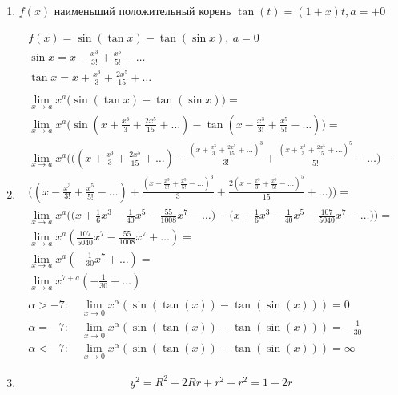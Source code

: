 \begin{enumerate}
		\item $f(x)$ наименьший положительный корень $\tan(t)=(1+x) t, a=+0$
		\item
			\begin{gather*}
				f(x) = \sin(\tan x) - \tan(\sin x),\ a = 0\\
				\sin x = x - \frac{x^{3}}{3!} + \frac{x^{5}}{5!} - \ldots\\
				\tan x = x + \frac{x^{3}}{3} + \frac{2x^{5}}{15} + \ldots\\
				\\
				\lim\limits_{x \to a} x^a \Big( \sin(\tan x) - \tan(\sin x) \Big) = \\
				\lim\limits_{x \to a} x^a \Big( \sin(x + \frac{x^{3}}{3} + \frac{2x^{5}}{15} + \ldots) - \tan(x - \frac{x^{3}}{3!} + \frac{x^{5}}{5!} - \ldots) \Big) = \\
				\lim\limits_{x \to a} x^a \Bigg( \Big((x + \frac{x^{3}}{3} + \frac{2x^{5}}{15} + \ldots) - \frac{(x + \frac{x^{3}}{3} + \frac{2x^{5}}{15} + \ldots)^{3}}{3!} + \frac{(x + \frac{x^{3}}{3} + \frac{2x^{5}}{15} + \ldots)^{5}}{5!} - \ldots \Big) - \\
				\Big((x - \frac{x^{3}}{3!} + \frac{x^{5}}{5!} - \ldots) + \frac{(x - \frac{x^{3}}{3!} + \frac{x^{5}}{5!} - \ldots)^{3}}{3} + \frac{2(x - \frac{x^{3}}{3!} + \frac{x^{5}}{5!} - \ldots)^{5}}{15} + \ldots \Big) \Bigg) = \\
				\lim\limits_{x \to a} x^a \Bigg( \Big( x + \frac{1}{6}x^3 - \frac{1}{40}x^5 - \frac{55}{1008}x^7 - \ldots \Big) - \Big( x + \frac{1}{6}x^3 - \frac{1}{40}x^5 - \frac{107}{5040}x^7 - \ldots \Big) \Bigg) = \\
				\lim\limits_{x \to a} x^a (\frac{107}{5040}x^7 - \frac{55}{1008}x^7 + \ldots) = \\
				\lim\limits_{x \to a} x^a ( - \frac{1}{30}x^7 + \ldots) = \\
				\lim\limits_{x \to a} x^{7 + a} ( - \frac{1}{30} + \ldots)\\
				\\
				\alpha> - 7:\quad \lim\limits_{x\to 0}x^{\alpha}(\sin(\tan(x)) - \tan(\sin(x))) = 0\\
				\alpha = - 7:\quad \lim\limits_{x\to 0}x^{\alpha}(\sin(\tan(x)) - \tan(\sin(x))) = - \frac{1}{30}\\
				\alpha< - 7:\quad \lim\limits_{x\to 0}x^{\alpha}(\sin(\tan(x)) - \tan(\sin(x))) = \infty 
			\end{gather*}
		\item 
			\begin{gather*}
				y^{2} = R^{2} - 2Rr + r^{2} - r^{2} = 1 - 2r\\

\end{gather*}
\end{enumerate}
